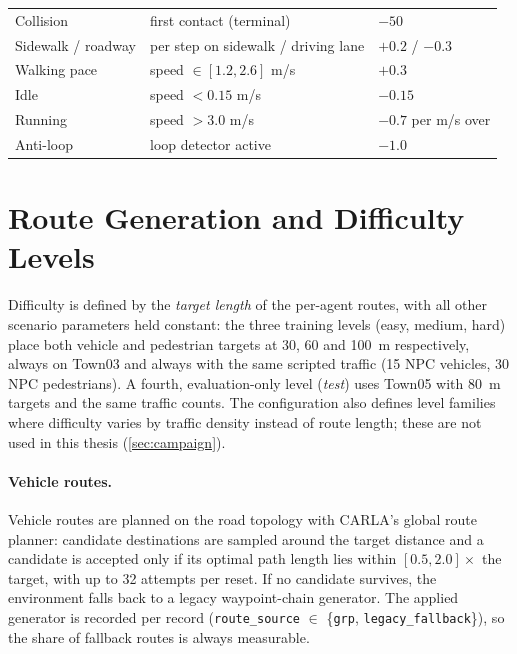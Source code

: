 \begin{table}[t]
\begin{tabular}{@{}p{3.4cm}p{5.6cm}p{4.6cm}@{}}
    Collision             & first contact (terminal) & $-50$ \\
    Sidewalk / roadway    & per step on sidewalk / driving lane & $+0.2$ / $-0.3$ \\
    Walking pace          & speed $\in [1.2, 2.6]$ m/s & $+0.3$ \\
    Idle                  & speed $< 0.15$ m/s & $-0.15$ \\
    Running               & speed $> 3.0$ m/s & $-0.7$ per m/s over \\
    Anti-loop             & loop detector active & $-1.0$ \\
    \bottomrule
  \end{tabular}
\end{table}

\section{Route Generation and Difficulty Levels}
\label{sec:routes}

Difficulty is defined by the \emph{target length} of the per-agent routes,
with all other scenario parameters held constant: the three training
levels (easy, medium, hard) place both vehicle and pedestrian targets at
30, 60 and \SI{100}{m} respectively, always on Town03 and always with the
same scripted traffic (15 NPC vehicles, 30 NPC pedestrians). A fourth,
evaluation-only level (\emph{test}) uses Town05 with \SI{80}{m} targets
and the same traffic counts. The configuration also defines level families
where difficulty varies by traffic density instead of route length; these
are not used in this thesis (\cref{sec:campaign}).

\paragraph{Vehicle routes.}
Vehicle routes are planned on the road topology with CARLA's global route
planner: candidate destinations are sampled around the target distance and
a candidate is accepted only if its optimal path length lies within
$[0.5, 2.0] \times$ the target, with up to 32 attempts per reset. If no
candidate survives, the environment falls back to a legacy waypoint-chain
generator. The applied generator is recorded per record
(\texttt{route\_source} $\in$ \{\texttt{grp},
\texttt{legacy\_fallback}\}), so the share of fallback routes is always
measurable.

